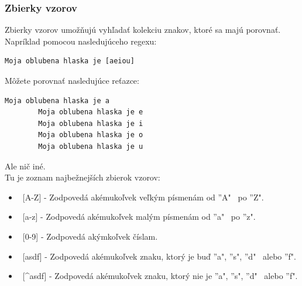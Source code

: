 \documentclass[10pt,twoside,slovak,a4paper]{article}
\begin{document}
\subsubsection{Zbierky vzorov}
Zbierky vzorov umožňujú vyhľadať kolekciu znakov, ktoré sa majú porovnať. Napríklad pomocou nasledujúceho regexu:
\begin{lstlisting}[frame=single, basicstyle=\ttfamily\small, label=code:example]
	Moja oblubena hlaska je [aeiou]
	\end{lstlisting}
	Môžete porovnať nasledujúce reťazce:
	\begin{lstlisting}[frame=single, basicstyle=\ttfamily\small, label=code:example]
		Moja oblubena hlaska je a
		Moja oblubena hlaska je e
		Moja oblubena hlaska je i
		Moja oblubena hlaska je o
		Moja oblubena hlaska je u
		\end{lstlisting}
Ale nič iné.\\
Tu je zoznam najbežnejších zbierok vzorov:
\begin{itemize}
	\item \ [A-Z] - Zodpovedá akémukoľvek veľkým písmenám od ''A" \ po ''Z".
	\item \ [a-z] - Zodpovedá akémukoľvek malým písmenám od ''a" \ po ''z".
	\item \ [0-9] - Zodpovedá akýmkoľvek číslam.
	\item \ [asdf] - Zodpovedá akémukoľvek znaku, ktorý je buď ''a", ''s", ''d" \ alebo ''f".
	\item \ [\textasciicircum asdf] - Zodpovedá akémukoľvek znaku, ktorý nie je ''a", ''s", ''d" \ alebo ''f".
  	\end{itemize}
\end{document}
